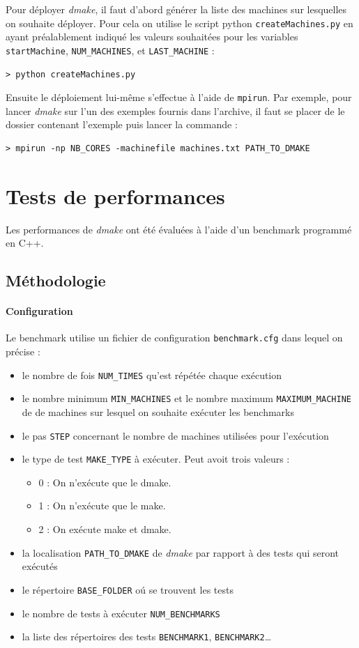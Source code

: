 \documentclass[a4paper,12pt,twoside]{article}
\begin{document}
Pour déployer \emph{dmake}, il faut d'abord générer la liste des
machines sur lesquelles on souhaite déployer. Pour cela on utilise le
script python \texttt{createMachines.py} en ayant préalablement indiqué
les valeurs souhaitées pour les variables \texttt{startMachine},
\texttt{NUM\_MACHINES}, et \texttt{LAST\_MACHINE} : 
\begin{verbatim}
> python createMachines.py
\end{verbatim}

Ensuite le déploiement lui-même s'effectue à l'aide de
\texttt{mpirun}. Par exemple, pour lancer \emph{dmake} sur l'un des
exemples fournis dans l'archive, il faut se placer de le dossier
contenant l'exemple puis lancer la commande :
\begin{verbatim}
> mpirun -np NB_CORES -machinefile machines.txt PATH_TO_DMAKE
\end{verbatim}

\section{Tests de performances}

Les performances de \emph{dmake} ont été évaluées à l'aide d'un
benchmark programmé en C++.

\subsection{Méthodologie}

\paragraph{Configuration}
Le benchmark utilise un fichier de configuration
\texttt{benchmark.cfg} dans lequel on précise : 
\begin{itemize}
\item le nombre de fois
\texttt{NUM\_TIMES} qu'est répétée chaque exécution
\item  le nombre minimum \texttt{MIN\_MACHINES}
et le nombre maximum \texttt{MAXIMUM\_MACHINE} de de machines 
sur lesquel on souhaite exécuter les benchmarks
\item le pas \texttt{STEP} concernant le nombre de machines utilisées
  pour l'exécution
\item le type de test \texttt{MAKE\_TYPE} à exécuter. Peut avoit trois valeurs :
	\begin{itemize}
	\item  0 : On n'exécute que le dmake.
	\item  1 : On n'exécute que le make.
	\item  2 : On exécute make et dmake.
	\end{itemize}
\item la localisation \texttt{PATH\_TO\_DMAKE} de \emph{dmake}
par rapport à des tests qui seront exécutés
\item le répertoire \texttt{BASE\_FOLDER} oú se trouvent les tests
\item le nombre de tests à exécuter \texttt{NUM\_BENCHMARKS}
\item la liste des répertoires des tests \texttt{BENCHMARK1}, \texttt{BENCHMARK2}\dots
\end{itemize}
\end{document}
